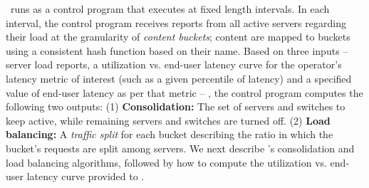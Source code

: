 \shrink\ runs as a control program that executes at fixed length intervals. In each interval, the control program receives  reports from all active servers regarding their load at the granularity of \emph{content buckets}; content are mapped to buckets using a consistent hash function based on their name.  
Based on three inputs  -- server load reports, a utilization vs. end-user latency curve for the operator's latency metric of interest (such as a given percentile of latency) and a specified value of end-user latency as per that metric -- , the control program computes the following two outputs: (1) \textbf{Consolidation:} The set of servers and switches to keep active, while remaining servers and switches are turned off. (2) \textbf{Load balancing:} A \emph{traffic split} for each bucket describing the ratio in which the bucket's requests are split among servers. We next describe \shrink's consolidation and load balancing algorithms, followed by how to compute the utilization vs. end-user latency curve provided to \shrink.
%
%
%
%
%
%
%






